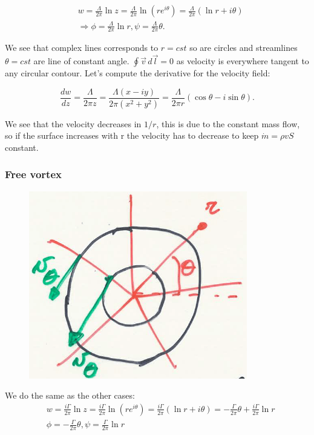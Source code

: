 \documentclass[british,french,11pt, a4paper, openany]{article}
\begin{document}
\begin{equation}
\begin{aligned}
&w = \frac{\Lambda}{2\pi} \ln z = \frac{\Lambda}{2\pi} \ln (r e^{i\theta}) = \frac{\Lambda}{2\pi} (\ln r + i\theta) \\
&\Rightarrow \phi = \frac{\Lambda}{2\pi} \ln r, \psi =  \frac{\Lambda}{2\pi}\theta.
\end{aligned}
\end{equation}

We see that complex lines corresponds to $r =cst$ so are circles and streamlines $\theta = cst$ are line of constant angle. $\oint \vec{v}\, d\vec{l}=0$ as velocity is everywhere tangent to any circular contour. Let's compute the derivative for the velocity field:

\begin{equation}
\frac{dw}{dz} = \frac{\Lambda}{2\pi z} = \frac{\Lambda (x-iy)}{2\pi (x^2+y^2)} = \frac{\Lambda}{2\pi r} (\cos \theta - i \sin \theta).
\end{equation}

We see that the velocity decreases in $1/r$, this is due to the constant mass flow, so if the surface increases with r the velocity has to decrease to keep $\dot{m} = \rho v S$ constant. 

\subsubsection{Free vortex}
\begin{figure}
	\vspace{-5mm}
	\includegraphics[scale=0.23]{ch2/26}
\end{figure}
We do the same as the other cases: 
\begin{equation}
\begin{aligned}
&w = \frac{i\Gamma}{2\pi} \ln z = \frac{i\Gamma}{2\pi} \ln (re^{i\theta}) = \frac{i\Gamma}{2\pi} (\ln r + i\theta) = -\frac{\Gamma}{2\pi} \theta + \frac{i\Gamma}{2\pi} \ln r \\
&\phi = -\frac{\Gamma}{2\pi} \theta, \psi = \frac{\Gamma}{2\pi} \ln r
\end{aligned}
\end{equation}
\end{document}
